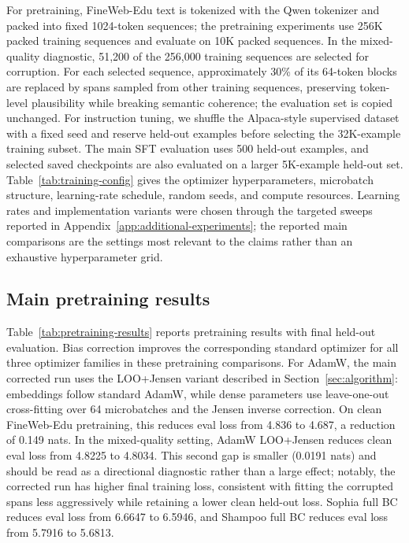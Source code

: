 \documentclass{article}
\begin{document}
For pretraining, FineWeb-Edu text is tokenized with the Qwen tokenizer and packed into fixed 1024-token sequences; the pretraining experiments use 256K packed training sequences and evaluate on 10K packed sequences. In the mixed-quality diagnostic, 51,200 of the 256,000 training sequences are selected for corruption. For each selected sequence, approximately 30\% of its 64-token blocks are replaced by spans sampled from other training sequences, preserving token-level plausibility while breaking semantic coherence; the evaluation set is copied unchanged. For instruction tuning, we shuffle the Alpaca-style supervised dataset with a fixed seed and reserve held-out examples before selecting the 32K-example training subset. The main SFT evaluation uses 500 held-out examples, and selected saved checkpoints are also evaluated on a larger 5K-example held-out set. Table~\ref{tab:training-config} gives the optimizer hyperparameters, microbatch structure, learning-rate schedule, random seeds, and compute resources. Learning rates and implementation variants were chosen through the targeted sweeps reported in Appendix~\ref{app:additional-experiments}; the reported main comparisons are the settings most relevant to the claims rather than an exhaustive hyperparameter grid.

\subsection{Main pretraining results}

Table~\ref{tab:pretraining-results} reports pretraining results with final held-out evaluation. Bias correction improves the corresponding standard optimizer for all three optimizer families in these pretraining comparisons. For AdamW, the main corrected run uses the LOO+Jensen variant described in Section~\ref{sec:algorithm}: embeddings follow standard AdamW, while dense parameters use leave-one-out cross-fitting over 64 microbatches and the Jensen inverse correction. On clean FineWeb-Edu pretraining, this reduces eval loss from 4.836 to 4.687, a reduction of 0.149 nats. In the mixed-quality setting, AdamW LOO+Jensen reduces clean eval loss from 4.8225 to 4.8034. This second gap is smaller (0.0191 nats) and should be read as a directional diagnostic rather than a large effect; notably, the corrected run has higher final training loss, consistent with fitting the corrupted spans less aggressively while retaining a lower clean held-out loss. Sophia full BC reduces eval loss from 6.6647 to 6.5946, and Shampoo full BC reduces eval loss from 5.7916 to 5.6813.
\end{document}
